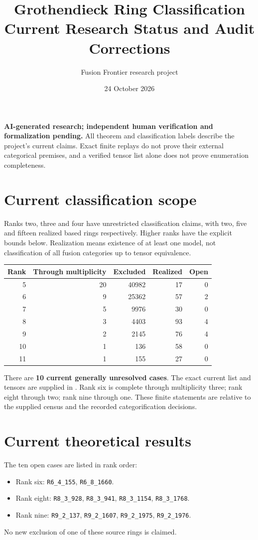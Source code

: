 \documentclass[11pt,a4paper]{article}
\title{Grothendieck Ring Classification\\Current Research Status and Audit Corrections}
\author{Fusion Frontier research project}\date{24 October 2026}
\begin{document}
\maketitle
\textbf{AI-generated research; independent human verification and formalization pending.}
All theorem and classification labels describe the project's current claims.
Exact finite replays do not prove their external categorical premises, and a
verified tensor list alone does not prove enumeration completeness.

\section{Current classification scope}
Ranks two, three and four have unrestricted classification claims, with two,
five and fifteen realized based rings respectively. Higher ranks have the
explicit bounds below. Realization means existence of at least one model,
not classification of all fusion categories up to tensor equivalence.

\begin{center}\begin{tabular}{rrrrr}\toprule
Rank & Through multiplicity & Excluded & Realized & Open\\\midrule
5&20&40982&17&0\\
6&9&25362&57&2\\
7&5&9976&30&0\\
8&3&4403&93&4\\
9&2&2145&76&4\\
10&1&136&58&0\\
11&1&155&27&0\\\bottomrule
\end{tabular}\end{center}
There are \textbf{10 current generally unresolved cases}. The exact current
list and tensors are supplied in .
Rank six is complete through multiplicity three; rank eight through two;
rank nine through one. These finite statements are relative to the supplied
census and the recorded categorification decisions.

\section{Current theoretical results}
The ten open cases are listed in rank order:
\begin{itemize}
\item Rank six: \texttt{R6\_4\_155}, \texttt{R6\_8\_1660}.
\item Rank eight: \texttt{R8\_3\_928}, \texttt{R8\_3\_941},
      \texttt{R8\_3\_1154}, \texttt{R8\_3\_1768}.
\item Rank nine: \texttt{R9\_2\_137}, \texttt{R9\_2\_1607},
      \texttt{R9\_2\_1975}, \texttt{R9\_2\_1976}.
\end{itemize}
No new exclusion of one of these source rings is claimed.
\end{document}
